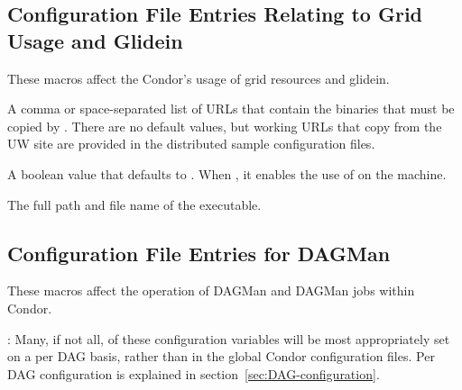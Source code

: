 \subsection{\label{sec:Grid-Config-File-Entries}Configuration File
Entries Relating to Grid Usage and Glidein}

These macros affect the Condor's usage of grid resources
and glidein.
\begin{description}
\label{param:GlideinServerURLS}
\item[\Macro{GLIDEIN\_SERVER\_URLS}]
  A comma or space-separated list of URLs that contain the binaries
  that must be copied by .
  There are no default values, but working URLs that copy from the UW site
  are provided in the distributed sample configuration files.

\label{param:GlexecJob}
\item[\Macro{GLEXEC\_JOB}]
  A boolean value that defaults to .
  When , it enables the use of  on the machine.

\label{param:Glexec}
\item[\Macro{GLEXEC}]
  The full path and file name of the  executable.

\end{description}

\subsection{\label{sec:DAGMan-Config-File-Entries}Configuration File 
Entries for DAGMan}

These macros affect the operation of DAGMan and DAGMan
jobs within Condor.

: Many, if not all, of these configuration variables will
be most appropriately set on a per DAG basis, rather than in the
global Condor configuration files.  Per DAG configuration is explained
in section~\ref{sec:DAG-configuration}.


